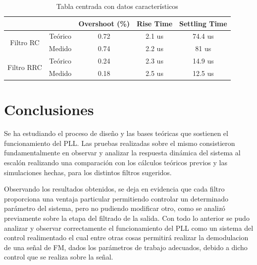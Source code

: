 \documentclass{article}
\begin{document}
\begin{table}[H]
	\centering
\begin{tabular}{|c|c|c|c|c|}
\hline
\multicolumn{2}{|c|}{}                & Overshoot (\%) & Rise Time & Settling Time \\ \hline
\multirow{2}{*}{Filtro RC}  & Teórico & 0.72           & 2.1 us    & 74.4 us       \\ \cline{2-5} 
                            & Medido  & 0.74           & 2.2 us    & 81 us         \\ \hline
\multirow{2}{*}{Filtro RRC} & Teórico & 0.24           & 2.3 us    & 14.9 us       \\ \cline{2-5} 
                            & Medido  & 0.18           & 2.5 us    & 12.5 us       \\ \hline
\end{tabular}
	\caption{Tabla centrada con datos característicos}
\end{table}

\newpage

\section*{Conclusiones}
Se ha estudiando el proceso de diseño y las bases teóricas que sostienen el funcionamiento del PLL. Las pruebas realizadas sobre el mismo consistieron fundamentalmente en observar y analizar la respuesta dinámica del sistema al escalón realizando una comparación con los cálculos teóricos previos y las simulaciones hechas, para los distintos filtros sugeridos.\par
Observando los resultados obtenidos, se deja en evidencia que cada filtro proporciona una ventaja particular permitiendo controlar un determinado parámetro del sistema, pero no pudiendo modificar otro, como se analizó previamente sobre la etapa del filtrado de la salida. Con todo lo anterior se pudo analizar y observar correctamente el funcionamiento del PLL como un sistema del control realimentado el cual entre otras cosas permitirá realizar la demodulacion de una señal de FM, dados los parámetros de trabajo adecuados, debido a dicho control que se realiza sobre la señal.
\end{document}
